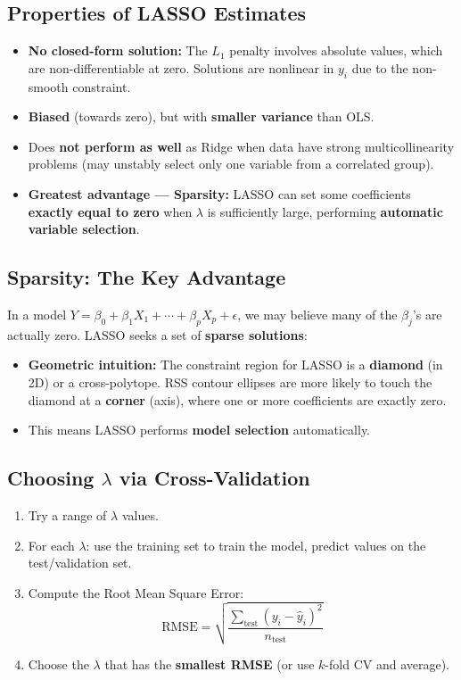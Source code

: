 \documentclass{article}
\begin{document}
\subsection{Properties of LASSO Estimates}
\begin{itemize}
    \item \textbf{No closed-form solution:} The $L_1$ penalty involves absolute values, which are non-differentiable at zero. Solutions are nonlinear in $y_i$ due to the non-smooth constraint.
    \item \textbf{Biased} (towards zero), but with \textbf{smaller variance} than OLS.
    \item Does \textbf{not perform as well} as Ridge when data have strong multicollinearity problems (may unstably select only one variable from a correlated group).
    \item \textbf{Greatest advantage --- Sparsity:} LASSO can set some coefficients \textbf{exactly equal to zero} when $\lambda$ is sufficiently large, performing \textbf{automatic variable selection}.
\end{itemize}

\subsection{Sparsity: The Key Advantage}
In a model $Y = \beta_0 + \beta_1 X_1 + \cdots + \beta_p X_p + \epsilon$, we may believe many of the $\beta_j$'s are actually zero. LASSO seeks a set of \textbf{sparse solutions}:
\begin{itemize}
    \item \textbf{Geometric intuition:} The constraint region for LASSO is a \textbf{diamond} (in 2D) or a cross-polytope. RSS contour ellipses are more likely to touch the diamond at a \textbf{corner} (axis), where one or more coefficients are exactly zero.
    \item This means LASSO performs \textbf{model selection} automatically.
\end{itemize}

\subsection{Choosing $\lambda$ via Cross-Validation}
\begin{enumerate}
    \item Try a range of $\lambda$ values.
    \item For each $\lambda$: use the training set to train the model, predict values on the test/validation set.
    \item Compute the Root Mean Square Error:
    $$\text{RMSE} = \sqrt{\frac{\sum_{\text{test}} (y_i - \hat{y}_i)^2}{n_{\text{test}}}}$$
    \item Choose the $\lambda$ that has the \textbf{smallest RMSE} (or use $k$-fold CV and average).
\end{enumerate}
\end{document}
